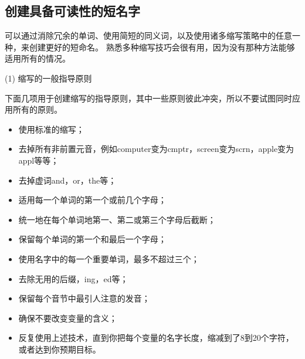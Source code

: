 \documentclass{article}
\begin{document}
\subsection{创建具备可读性的短名字}
可以通过消除冗余的单词、使用简短的同义词，以及使用诸多缩写策略中的任意一种，来创建更好的短命名。
熟悉多种缩写技巧会很有用，因为没有那种方法能够适用所有的情况。
\par
(1) 缩写的一般指导原则
\par
下面几项用于创建缩写的指导原则，其中一些原则彼此冲突，所以不要试图同时应用所有的原则。
\begin{itemize}
    \item 使用标准的缩写；
    \item 去掉所有非前置元音，例如computer变为cmptr，screen变为scrn，apple变为appl等等；
    \item 去掉虚词and，or，the等；
    \item 适用每一个单词的第一个或前几个字母；
    \item 统一地在每个单词地第一、第二或第三个字母后截断；
    \item 保留每个单词的第一个和最后一个字母；
    \item 使用名字中的每一个重要单词，最多不超过三个；
    \item 去除无用的后缀，ing，ed等；
    \item 保留每个音节中最引人注意的发音；
    \item 确保不要改变变量的含义；
    \item 反复使用上述技术，直到你把每个变量的名字长度，缩减到了8到20个字符，或者达到你预期目标。
\end{itemize}
\end{document}
